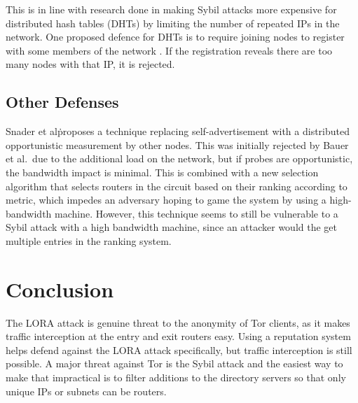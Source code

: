 \documentclass[10pt,a4paper]{article}
\begin{document}
This is in line with research done in making Sybil attacks more expensive for distributed hash tables (DHTs) \cite{dhtsec} by limiting the number of repeated IPs in the network.
One proposed defence for DHTs is to require joining nodes to register with some members of the network  \cite{dinger2006defending}.
If the registration reveals there are too many nodes with that IP, it is rejected.

\subsection{Other Defenses}



Snader et al\. proposes\cite{snader2008tune} a technique replacing self-advertisement with a distributed opportunistic measurement by other nodes.
This was initially rejected by Bauer et al.\ due to the additional load on the network, but if probes are opportunistic, the bandwidth impact is minimal.
This is combined with a new selection algorithm that selects routers in the circuit based on their ranking  according to metric, which impedes an adversary hoping to game the system by using a high-bandwidth machine.
However, this technique seems to still be vulnerable to a Sybil attack with a high bandwidth machine, since an attacker would the get multiple entries in the ranking system.


\section{Conclusion}
The LORA attack is genuine threat to the anonymity of Tor clients, as it makes traffic interception at the entry and exit routers easy.
Using a reputation system helps defend against the LORA attack specifically, but traffic interception is still possible. 
A major threat against Tor is the Sybil attack and the easiest way to make that impractical is to filter additions to the directory servers so that only unique IPs or subnets can be routers.



\end{document}
